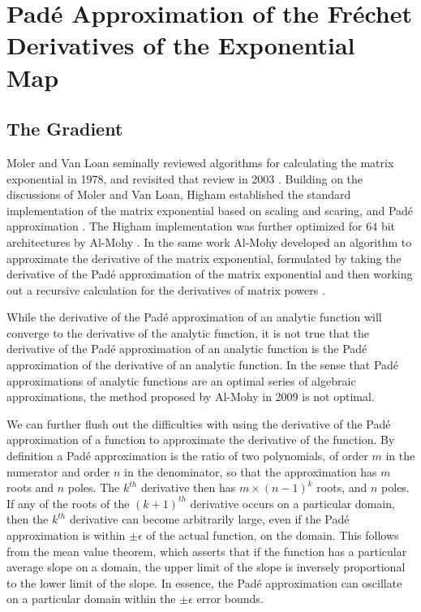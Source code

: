 \chapter{Pad\'{e} Approximation of the Fr\'{e}chet Derivatives of the Exponential Map}
\section{The Gradient}
Moler and Van Loan seminally reviewed algorithms for calculating the matrix exponential in
1978, and revisited that review in 2003 \cite{moler_nineteen_1978,moler_nineteen_2003}. 
Building on the discussions of Moler and Van Loan, Higham established the standard 
implementation of the matrix exponential based on scaling and scaring, and Pad\'{e} 
approximation \cite{higham_scaling_2005,higham_functions_2008}. The Higham implementation was
further optimized for $64$ bit architectures by Al-Mohy \cite{al-mohy_new_2009}. In the same
work Al-Mohy developed an algorithm to approximate the derivative of the matrix exponential, 
formulated by taking the derivative of the Pad\'{e} approximation of the matrix exponential 
and then working out a recursive calculation for the derivatives of matrix 
powers \cite{al-mohy_computing_2009}.

While the derivative of the Pad\'{e} approximation of an analytic function will converge to 
the derivative of the analytic function, it is not true that the derivative of the Pad\'{e} 
approximation of an analytic function is the Pad\'{e} approximation of the derivative of an 
analytic function. In the sense that Pad\'{e} approximations of analytic functions are an 
optimal series of algebraic approximations, the method proposed by Al-Mohy in 2009 is not 
optimal.

We can further flush out the difficulties with using the derivative of the Pad\'{e} 
approximation of a function to approximate the derivative of the function. By definition
a Pad\'{e} approximation is the ratio of two polynomials, of order $m$ in the numerator
and order $n$ in the denominator, so that the approximation has $m$ roots and $n$ poles. The
$k^{th}$ derivative then has $m \times \left(n-1\right)^k$ roots, and $n$ poles. If any of 
the roots of the $\left(k+1\right)^{th}$ derivative occurs on a particular domain, then the 
$k^{th}$ derivative can become arbitrarily large, even if the Pad\'{e} approximation is 
within $\pm\epsilon$ of the actual function, on the domain. This follows from the mean value
theorem, which asserts that if the function has a particular average slope on a domain, the
upper limit of the slope is inversely proportional to the lower limit of the slope. In 
essence, the Pad\'{e} approximation can oscillate on a particular domain within the 
$\pm\epsilon$ error bounds.

